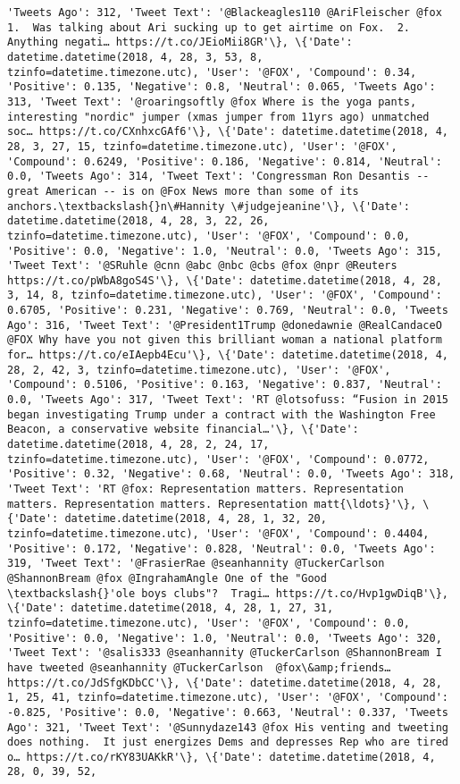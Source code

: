 \documentclass[11pt]{article}
\begin{document}
\begin{Verbatim}[commandchars=\\\{\}]
'Tweets Ago': 312, 'Tweet Text': '@Blackeagles110 @AriFleischer @fox 1.  Was talking about Ari sucking up to get airtime on Fox.  2.  Anything negati… https://t.co/JEioMii8GR'\}, \{'Date': datetime.datetime(2018, 4, 28, 3, 53, 8, tzinfo=datetime.timezone.utc), 'User': '@FOX', 'Compound': 0.34, 'Positive': 0.135, 'Negative': 0.8, 'Neutral': 0.065, 'Tweets Ago': 313, 'Tweet Text': '@roaringsoftly @fox Where is the yoga pants, interesting "nordic" jumper (xmas jumper from 11yrs ago) unmatched soc… https://t.co/CXnhxcGAf6'\}, \{'Date': datetime.datetime(2018, 4, 28, 3, 27, 15, tzinfo=datetime.timezone.utc), 'User': '@FOX', 'Compound': 0.6249, 'Positive': 0.186, 'Negative': 0.814, 'Neutral': 0.0, 'Tweets Ago': 314, 'Tweet Text': 'Congressman Ron Desantis -- great American -- is on @Fox News more than some of its anchors.\textbackslash{}n\#Hannity \#judgejeanine'\}, \{'Date': datetime.datetime(2018, 4, 28, 3, 22, 26, tzinfo=datetime.timezone.utc), 'User': '@FOX', 'Compound': 0.0, 'Positive': 0.0, 'Negative': 1.0, 'Neutral': 0.0, 'Tweets Ago': 315, 'Tweet Text': '@SRuhle @cnn @abc @nbc @cbs @fox @npr @Reuters https://t.co/pWbA8goS4S'\}, \{'Date': datetime.datetime(2018, 4, 28, 3, 14, 8, tzinfo=datetime.timezone.utc), 'User': '@FOX', 'Compound': 0.6705, 'Positive': 0.231, 'Negative': 0.769, 'Neutral': 0.0, 'Tweets Ago': 316, 'Tweet Text': '@President1Trump @donedawnie @RealCandaceO @FOX Why have you not given this brilliant woman a national platform for… https://t.co/eIAepb4Ecu'\}, \{'Date': datetime.datetime(2018, 4, 28, 2, 42, 3, tzinfo=datetime.timezone.utc), 'User': '@FOX', 'Compound': 0.5106, 'Positive': 0.163, 'Negative': 0.837, 'Neutral': 0.0, 'Tweets Ago': 317, 'Tweet Text': 'RT @lotsofuss: “Fusion in 2015 began investigating Trump under a contract with the Washington Free Beacon, a conservative website financial…'\}, \{'Date': datetime.datetime(2018, 4, 28, 2, 24, 17, tzinfo=datetime.timezone.utc), 'User': '@FOX', 'Compound': 0.0772, 'Positive': 0.32, 'Negative': 0.68, 'Neutral': 0.0, 'Tweets Ago': 318, 'Tweet Text': 'RT @fox: Representation matters. Representation matters. Representation matters. Representation matt{\ldots}'\}, \{'Date': datetime.datetime(2018, 4, 28, 1, 32, 20, tzinfo=datetime.timezone.utc), 'User': '@FOX', 'Compound': 0.4404, 'Positive': 0.172, 'Negative': 0.828, 'Neutral': 0.0, 'Tweets Ago': 319, 'Tweet Text': '@FrasierRae @seanhannity @TuckerCarlson @ShannonBream @fox @IngrahamAngle One of the "Good \textbackslash{}'ole boys clubs"?  Tragi… https://t.co/Hvp1gwDiqB'\}, \{'Date': datetime.datetime(2018, 4, 28, 1, 27, 31, tzinfo=datetime.timezone.utc), 'User': '@FOX', 'Compound': 0.0, 'Positive': 0.0, 'Negative': 1.0, 'Neutral': 0.0, 'Tweets Ago': 320, 'Tweet Text': '@salis333 @seanhannity @TuckerCarlson @ShannonBream I have tweeted @seanhannity @TuckerCarlson  @fox\&amp;friends… https://t.co/JdSfgKDbCC'\}, \{'Date': datetime.datetime(2018, 4, 28, 1, 25, 41, tzinfo=datetime.timezone.utc), 'User': '@FOX', 'Compound': -0.825, 'Positive': 0.0, 'Negative': 0.663, 'Neutral': 0.337, 'Tweets Ago': 321, 'Tweet Text': '@Sunnydaze143 @fox His venting and tweeting does nothing.  It just energizes Dems and depresses Rep who are tired o… https://t.co/rKY83UAKkR'\}, \{'Date': datetime.datetime(2018, 4, 28, 0, 39, 52, 
\end{Verbatim}
\end{document}
